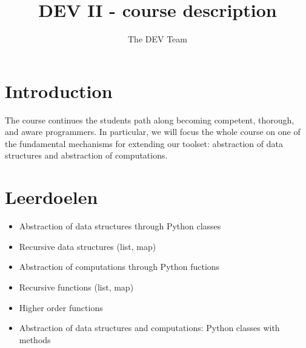 \documentclass[10pt,a4paper]{article}
\author{The DEV Team}
\title{DEV II - course description}
\begin{document}
\section{Introduction}
The course continues the students path along becoming competent, thorough, and aware programmers. In particular, we will focus the whole course on one of the fundamental mechanisms for extending our toolset: abstraction of data structures and abstraction of computations.


\section{Leerdoelen}
\begin{itemize}
\item Abstraction of data structures through Python classes
\item Recursive data structures (list, map)
\item Abstraction of computations through Python fuctions
\item Recursive functions (list, map)
\item Higher order functions
\item Abstraction of data structures and computations: Python classes with methods
\end{itemize}
\end{document}
